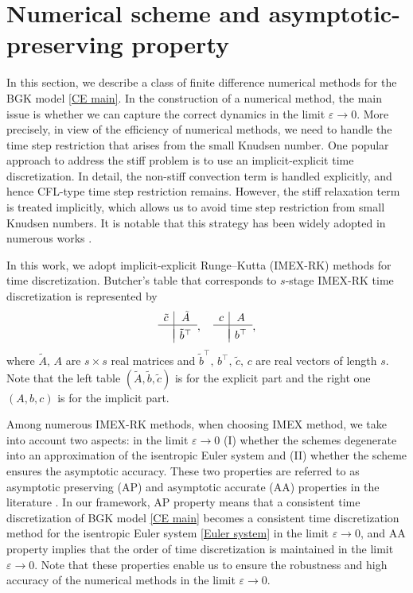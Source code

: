 \documentclass[10pt,reqno]{amsart}
\numberwithin{equation}{section}
\begin{document}
\section{Numerical scheme and asymptotic-preserving property}\label{sec_numer}
In this section, we describe a class of finite difference numerical methods for the BGK model \eqref{CE main}. In the construction of a numerical method, the main issue is whether we can capture the correct dynamics in the limit $\varepsilon\to 0$. More precisely, in view of the efficiency of numerical methods, we need to handle the time step restriction that arises from the small Knudsen number. One popular approach to address the stiff problem is to use an implicit-explicit time discretization. In detail, the non-stiff convection term is handled explicitly, and hence CFL-type time step restriction remains. However, the stiff relaxation term is treated implicitly, which allows us to avoid time step restriction from small Knudsen numbers. It is notable that this strategy has been widely adopted in numerous works \cite{FJ,ZH, PP}. 

In this work, we adopt implicit-explicit Runge--Kutta (IMEX-RK) methods for time discretization. Butcher's table that corresponds to $s$-stage IMEX-RK time discretization is represented by
\begin{align*}%
	\begin{array}{c|c}
		\tilde{c} & \tilde{A}\\
		\hline \\[-3mm]
		& \tilde{b}^\top
	\end{array},\quad \begin{array}{c|c}
		c & A\\
		\hline \\[-3mm]
		& b^\top
	\end{array},
\end{align*}
where $\tilde{A},\,A$ are $s\times s$ real matrices and $\tilde{b}^\top,\,b^\top,\,\tilde{c},\,c$ are real vectors of length $s$. Note that the left table $(\tilde{A},\tilde{b},\tilde{c})$ is for the explicit part and the right one $(A,b,c)$ is for the implicit part. 

Among numerous IMEX-RK methods, when choosing IMEX method, we take into account two aspects: in the limit $\varepsilon\to0$ (I) whether the schemes degenerate into an approximation of the isentropic Euler system and (II) whether the scheme ensures the asymptotic accuracy. 
These two properties are referred to as asymptotic preserving (AP) and asymptotic accurate (AA) properties in the literature \cite{BPR}. In our framework, AP property means that a consistent time discretization of BGK model \eqref{CE main} becomes a consistent time discretization method for the isentropic Euler system \eqref{Euler system} in the limit $\varepsilon\to 0$, and AA property implies that the order of time discretization is maintained in the limit $\varepsilon\to 0$. Note that these properties enable us to ensure the robustness and high accuracy of the numerical methods in the limit $\varepsilon \to 0$. 
\end{document}
